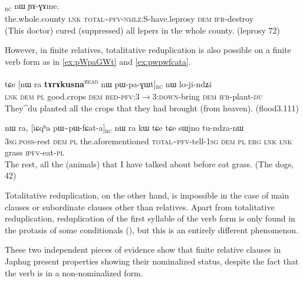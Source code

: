\documentclass[oldfontcommands,oneside,a4paper,11pt]{article}
\newcommand{\ipa}[1]{{\phon #1}} %
\newcommand{\topic}{\textsc{dem}}
\newcommand{\tete}{\textsuperscript{\textsc{head}}}
\newcommand{\rc}{\textsubscript{\textsc{rc}}}
\begin{document}
\begin{exe}
   \ex  \label{ex:kakwnandza}
\gll [<quanxian>  	\ipa{tɕe}  	\ipa{kɯ\textasciitilde{}kɤ-kɯ-nɤndza}]\rc{}  	\ipa{nɯ}  	\ipa{ɲɤ-ɣɤme.}      	\\
the.whole.county \textsc{lnk}  \textsc{total\textasciitilde{}pfv-nmlz:S}-have.leprosy \topic{} \textsc{ifr}-destroy \\
 \glt  (This doctor) cured (suppressed) all lepers in the whole county. (leprosy 72)
   \end{exe} 


However, in finite relatives, totalitative reduplication is also possible on a finite verb form as in \ref{ex:pWpaGWt} and \ref{ex:pwpwfcata}.

  \begin{exe}
\ex \label{ex:pWpaGWt}
\gll
\ipa{tɕe}  	[\ipa{nɯ} \ipa{ra}  	\textbf{\ipa{tɤrɤkusna}}\tete{}  	\ipa{nɯ}  	\ipa{pɯ-pa-ɣɯt}]\rc{}  	\ipa{nɯ}  	\ipa{lo-ji-ndʑi}  \\
\textsc{lnk} \textsc{dem} \textsc{pl} good.crops \topic{} \textsc{red-pfv:3$\rightarrow$3:down}-bring \topic{} \textsc{ifr}-plant-\textsc{du} \\
\glt They^{du} planted all the crops that they had brought (from heaven). (flood3.111)
\end{exe}

  \begin{exe}
   \ex \label{ex:pwpwfcata}
 \gll \ipa{ɯ-ro}   	\ipa{nɯ} \ipa{ra,}   	[\ipa{iɕqʰa}   	\ipa{pɯ\textasciitilde{}pɯ-fɕat-a}]\rc{}   	\ipa{nɯ} \ipa{ra}  	\ipa{kɯ}   	\ipa{tɕe}   	\ipa{tɕe}   	\ipa{sɯjno}   	\ipa{tu-ndza-nɯ}    \\
 \textsc{3sg.poss}-rest \topic{} \textsc{pl} the.aforementioned \textsc{total\textasciitilde{}pfv}-tell-\textsc{1sg} \topic{} \textsc{pl} \textsc{erg} \textsc{lnk} \textsc{lnk} grass \textsc{ipfv}-eat-\textsc{pl} \\
\glt The rest, all the (animals) that I have talked about before eat grass. (The dogs, 42)
\end{exe}


Totalitative reduplication, on the other hand, is impossible in the case of main clauses or subordinate clauses other than relatives. Apart from totalitative reduplication, reduplication of the first syllable of the verb form is only found in the protasis of some conditionals (\citealt{jacques14linking}), but this is an entirely different phenomenon.

These two independent pieces of evidence show that finite relative clauses in Japhug present properties showing their nominalized status, despite the fact that the verb is in a non-nominalized form.
\end{document}
